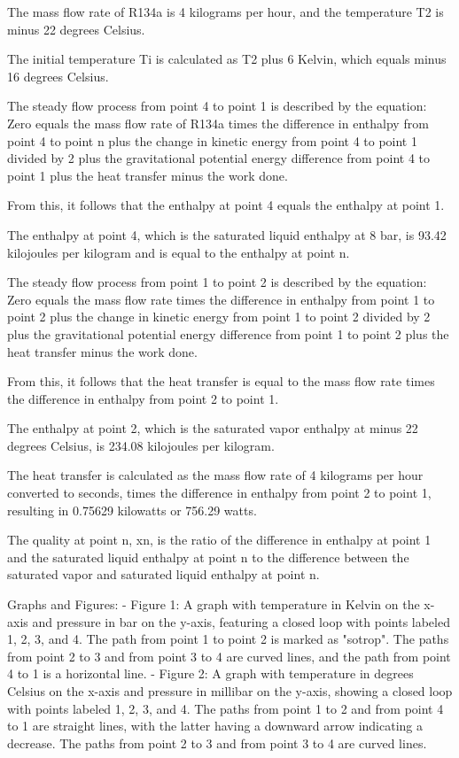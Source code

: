 The mass flow rate of R134a is 4 kilograms per hour, and the temperature T2 is minus 22 degrees Celsius.

The initial temperature Ti is calculated as T2 plus 6 Kelvin, which equals minus 16 degrees Celsius.

The steady flow process from point 4 to point 1 is described by the equation:
Zero equals the mass flow rate of R134a times the difference in enthalpy from point 4 to point n plus the change in kinetic energy from point 4 to point 1 divided by 2 plus the gravitational potential energy difference from point 4 to point 1 plus the heat transfer minus the work done.

From this, it follows that the enthalpy at point 4 equals the enthalpy at point 1.

The enthalpy at point 4, which is the saturated liquid enthalpy at 8 bar, is 93.42 kilojoules per kilogram and is equal to the enthalpy at point n.

The steady flow process from point 1 to point 2 is described by the equation:
Zero equals the mass flow rate times the difference in enthalpy from point 1 to point 2 plus the change in kinetic energy from point 1 to point 2 divided by 2 plus the gravitational potential energy difference from point 1 to point 2 plus the heat transfer minus the work done.

From this, it follows that the heat transfer is equal to the mass flow rate times the difference in enthalpy from point 2 to point 1.

The enthalpy at point 2, which is the saturated vapor enthalpy at minus 22 degrees Celsius, is 234.08 kilojoules per kilogram.

The heat transfer is calculated as the mass flow rate of 4 kilograms per hour converted to seconds, times the difference in enthalpy from point 2 to point 1, resulting in 0.75629 kilowatts or 756.29 watts.

The quality at point n, xn, is the ratio of the difference in enthalpy at point 1 and the saturated liquid enthalpy at point n to the difference between the saturated vapor and saturated liquid enthalpy at point n.

Graphs and Figures:
- Figure 1: A graph with temperature in Kelvin on the x-axis and pressure in bar on the y-axis, featuring a closed loop with points labeled 1, 2, 3, and 4. The path from point 1 to point 2 is marked as "sotrop". The paths from point 2 to 3 and from point 3 to 4 are curved lines, and the path from point 4 to 1 is a horizontal line.
- Figure 2: A graph with temperature in degrees Celsius on the x-axis and pressure in millibar on the y-axis, showing a closed loop with points labeled 1, 2, 3, and 4. The paths from point 1 to 2 and from point 4 to 1 are straight lines, with the latter having a downward arrow indicating a decrease. The paths from point 2 to 3 and from point 3 to 4 are curved lines.